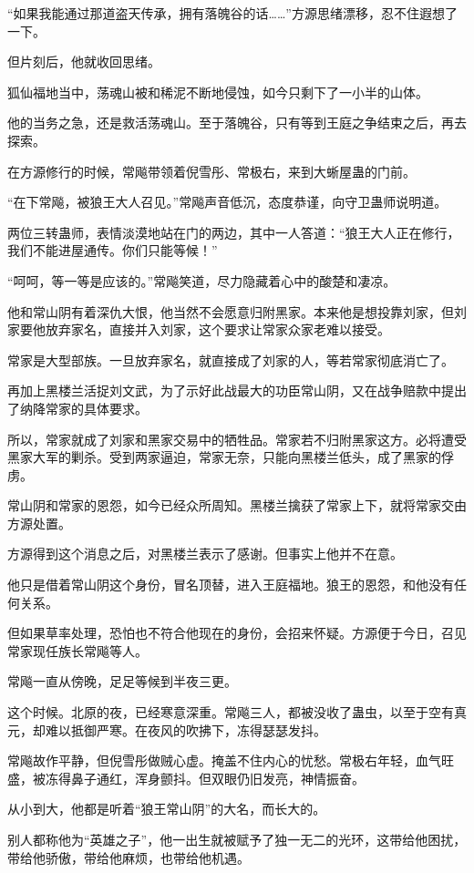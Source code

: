 \begin{this_body}
“如果我能通过那道盗天传承，拥有落魄谷的话……”方源思绪漂移，忍不住遐想了一下。

但片刻后，他就收回思绪。

狐仙福地当中，荡魂山被和稀泥不断地侵蚀，如今只剩下了一小半的山体。

他的当务之急，还是救活荡魂山。至于落魄谷，只有等到王庭之争结束之后，再去探索。

在方源修行的时候，常飚带领着倪雪彤、常极右，来到大蜥屋蛊的门前。

“在下常飚，被狼王大人召见。”常飚声音低沉，态度恭谨，向守卫蛊师说明道。

两位三转蛊师，表情淡漠地站在门的两边，其中一人答道：“狼王大人正在修行，我们不能进屋通传。你们只能等候！”

“呵呵，等一等是应该的。”常飚笑道，尽力隐藏着心中的酸楚和凄凉。

他和常山阴有着深仇大恨，他当然不会愿意归附黑家。本来他是想投靠刘家，但刘家要他放弃家名，直接并入刘家，这个要求让常家众家老难以接受。

常家是大型部族。一旦放弃家名，就直接成了刘家的人，等若常家彻底消亡了。

再加上黑楼兰活捉刘文武，为了示好此战最大的功臣常山阴，又在战争赔款中提出了纳降常家的具体要求。

所以，常家就成了刘家和黑家交易中的牺牲品。常家若不归附黑家这方。必将遭受黑家大军的剿杀。受到两家逼迫，常家无奈，只能向黑楼兰低头，成了黑家的俘虏。

常山阴和常家的恩怨，如今已经众所周知。黑楼兰擒获了常家上下，就将常家交由方源处置。

方源得到这个消息之后，对黑楼兰表示了感谢。但事实上他并不在意。

他只是借着常山阴这个身份，冒名顶替，进入王庭福地。狼王的恩怨，和他没有任何关系。

但如果草率处理，恐怕也不符合他现在的身份，会招来怀疑。方源便于今日，召见常家现任族长常飚等人。

常飚一直从傍晚，足足等候到半夜三更。

这个时候。北原的夜，已经寒意深重。常飚三人，都被没收了蛊虫，以至于空有真元，却难以抵御严寒。在夜风的吹拂下，冻得瑟瑟发抖。

常飚故作平静，但倪雪彤做贼心虚。掩盖不住内心的忧愁。常极右年轻，血气旺盛，被冻得鼻子通红，浑身颤抖。但双眼仍旧发亮，神情振奋。

从小到大，他都是听着“狼王常山阴”的大名，而长大的。

别人都称他为“英雄之子”，他一出生就被赋予了独一无二的光环，这带给他困扰，带给他骄傲，带给他麻烦，也带给他机遇。


\end{this_body}

